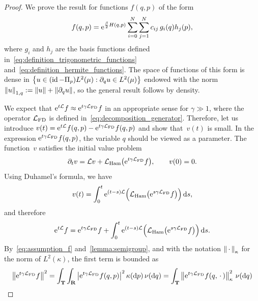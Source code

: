 \documentclass[11pt,a4paper]{article}
\begin{document}
\begin{proof}
    We prove the result for functions $f(q, p)$ of the form
    \begin{equation}
        \label{eq:expansion}
        f(q, p) = \mathrm{e}^{\frac{\beta}{2}H(q,p)}\sum_{i=0}^{N} \sum_{j=1}^{N} c_{ij} \, g_i(q) h_j(p),
    \end{equation}
    where $g_i$ and $h_j$ are the basis functions defined in~\eqref{eq:definition_trigonometric_functions} and~\eqref{eq:definition_hermite_functions}.
    The space of functions of this form is dense in $\bigl\{u \in (\operatorname{id} - \Pi_p) L^2(\mu): \partial_q u \in L^2(\mu) \bigr\}$
    endowed with the norm $\norm{u}_{1,q} := \norm{u} + \norm{\partial_q u}$,
    so the general result follows by density.

    We expect that $\mathrm{e}^{t \mathcal L} f \approx \mathrm{e}^{t \gamma \mathcal L_{\rm FD}} f$ in an appropriate sense for $\gamma \gg 1$,
    where the operator $\mathcal L_{\rm FD}$ is defined in~\eqref{eq:decomposition_generator}.
    Therefore, let us introduce $v(t) = \mathrm{e}^{t \mathcal L} f(q, p) - \mathrm{e}^{t \gamma \mathcal L_{\rm FD}} f(q, p)$
    and show that~$v(t)$ is small.
    In the expression $\mathrm{e}^{t \gamma \mathcal L_{\rm FD}} f(q, p)$,
    the variable $q$ should be viewed as a parameter.
    The function~$v$ satisfies the initial value problem
    \[
        \partial_t v = \mathcal L v +  \mathcal L_{\rm Ham} \bigl(\mathrm{e}^{t \gamma \mathcal L_{\rm FD}} f\bigr), \qquad v(0) = 0.
    \]
    Using Duhamel's formula, we have
    \[
        v(t) = \int_{0}^{t} \mathrm{e}^{(t-s) \mathcal L}  \Bigl( \mathcal L_{\rm Ham} \bigl(\mathrm{e}^{s \gamma \mathcal L_{\rm FD}} f\bigr) \Bigr) \, \mathrm d s,
    \]
    and therefore
    \begin{equation}
        \label{eq:intermediate_decay_correlation}
        \mathrm{e}^{t \mathcal L} f =  \mathrm{e}^{t \gamma \mathcal L_{\rm FD}} f
        + \int_{0}^{t} \mathrm{e}^{(t-s) \mathcal L}  \Bigl( \mathcal L_{\rm Ham} \bigl(\mathrm{e}^{s \gamma \mathcal L_{\rm FD}} f\bigr) \Bigr) \, \mathrm d s.
    \end{equation}
    By~\eqref{eq:assumption_f} and~\cref{lemma:semigroup},
    and with the notation $\norm{\dummy}[\kappa]$ for the norm of $L^2(\kappa)$,
    the first term is bounded as
    \begin{align}
        \notag
        \norm{\e^{t \gamma \mathcal L_{\rm FD}} f}^2
        &= \int_{\torus} \int_{\real}  \abs{\e^{t \gamma \mathcal L_{\rm FD}} f(q, p) }^2 \kappa(\d p) \,\nu(\d q)
        = \int_{\torus} \norm{\e^{t \gamma \mathcal L_{\rm FD}} f(q, \dummy) }[\kappa]^2 \, \nu(\d q) \\

\end{align}
\end{proof}
\end{document}
